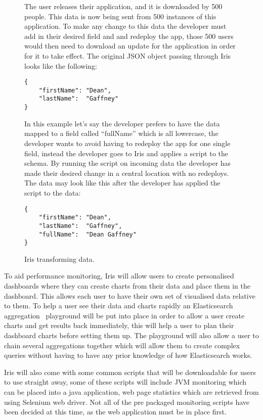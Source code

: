 \documentclass[12pt,a4paper,titlepage]{report}
\newcommand{\q}[1]{``#1''}
\begin{document}
\begin{figure}[H]
\begin{tcolorbox}

The user releases their application, and it is downloaded by 500 people. This data is now being sent from 500 instances of this application. To make any change to this data the developer must add in their desired field and and redeploy the app, those 500 users would then need to download an update for the application in order for it to take effect. The original JSON object passing through Iris looks like the following:
\begin{verbatim}
{
	"firstName": "Dean",
	"lastName":  "Gaffney"
}
\end{verbatim}

In this example let's say the developer prefers to have the data mapped to a field called \q{fullName} which is all lowercase, the developer wants to avoid having to redeploy the app for one single field, instead the developer goes to Iris and applies a script to the schema. By running the script on incoming data the developer has made their desired change in a central location with no redeploys. The data may look like this after the developer has applied the script to the data:
\begin{verbatim}
{
	"firstName": "Dean",
	"lastName":  "Gaffney",
	"fullName":  "Dean Gaffney"
}
\end{verbatim}
\end{tcolorbox}
\caption{Iris transforming data.}
\end{figure}

To aid performance monitoring, Iris will allow users to create personalised dashboards where they can create charts from their data and place them in the dashboard. This allows each user to have their own set of visualised data relative to them. To help a user see their data and charts rapidly an Elasticsearch aggregation~\parencite{Elastic.co.Aggregations} playground will be put into place in order to allow a user create charts and get results back immediately, this will help a user to plan their dashboard charts before setting them up. The playground will also allow a user to chain several aggregations together which will allow them to create complex queries without having to have any prior knowledge of how Elasticsearch works.

Iris will also come with some common scripts that will be downloadable for users to use straight away, some of these scripts will include JVM monitoring which can be placed into a java application, web page statistics which are retrieved from using Selenium web driver. Not all of the pre packaged monitoring scripts have been decided at this time, as the web application must be in place first.
\end{document}
